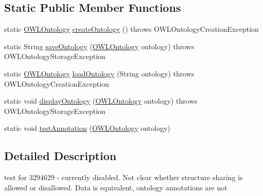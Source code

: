 \subsection*{Static Public Member Functions}
\begin{DoxyCompactItemize}
\item 
static \hyperlink{interfaceorg_1_1semanticweb_1_1owlapi_1_1model_1_1_o_w_l_ontology}{O\-W\-L\-Ontology} \hyperlink{classorg_1_1semanticweb_1_1owlapi_1_1api_1_1test_1_1syntax_1_1_shared_blank_node_test_case_a4e254e0b0eb48dd1e20c1d8c73ca2de7}{create\-Ontology} ()  throws O\-W\-L\-Ontology\-Creation\-Exception 
\item 
static String \hyperlink{classorg_1_1semanticweb_1_1owlapi_1_1api_1_1test_1_1syntax_1_1_shared_blank_node_test_case_a7b7fe71dd726a7d76cedf047a57c67f5}{save\-Ontology} (\hyperlink{interfaceorg_1_1semanticweb_1_1owlapi_1_1model_1_1_o_w_l_ontology}{O\-W\-L\-Ontology} ontology)  throws O\-W\-L\-Ontology\-Storage\-Exception 
\item 
static \hyperlink{interfaceorg_1_1semanticweb_1_1owlapi_1_1model_1_1_o_w_l_ontology}{O\-W\-L\-Ontology} \hyperlink{classorg_1_1semanticweb_1_1owlapi_1_1api_1_1test_1_1syntax_1_1_shared_blank_node_test_case_aab26a11f88d60ee78539f9b54b538e69}{load\-Ontology} (String ontology)  throws O\-W\-L\-Ontology\-Creation\-Exception 
\item 
static void \hyperlink{classorg_1_1semanticweb_1_1owlapi_1_1api_1_1test_1_1syntax_1_1_shared_blank_node_test_case_a6bc79dbd1e4cd861a5379d689d092f2d}{display\-Ontology} (\hyperlink{interfaceorg_1_1semanticweb_1_1owlapi_1_1model_1_1_o_w_l_ontology}{O\-W\-L\-Ontology} ontology)  throws O\-W\-L\-Ontology\-Storage\-Exception 
\item 
static void \hyperlink{classorg_1_1semanticweb_1_1owlapi_1_1api_1_1test_1_1syntax_1_1_shared_blank_node_test_case_a839a8a7325f55e79e9d60abd4454e68a}{test\-Annotation} (\hyperlink{interfaceorg_1_1semanticweb_1_1owlapi_1_1model_1_1_o_w_l_ontology}{O\-W\-L\-Ontology} ontology)
\end{DoxyCompactItemize}


\subsection{Detailed Description}
test for 3294629 -\/ currently disabled. Not clear whether structure sharing is allowed or disallowed. Data is equivalent, ontology annotations are not 

